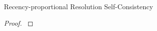 \begin{theorem}{Recency-proportional Resolution Self-Consistency}
\label{thm:recency-proportional-resolution-algo-self-consistency}

\end{theorem}

\begin{proof}
\label{prf:recency-proportional-resolution-algo-self-consistency}

\end{proof}
